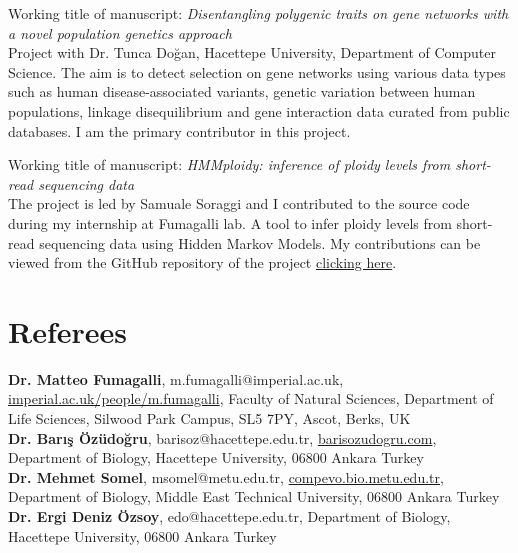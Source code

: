 \documentclass[letterpaper,11pt]{article}
\begin{document}
Working title of manuscript: \textit{Disentangling polygenic traits on gene networks with a novel population genetics approach} \\
Project with Dr. Tunca Do\u{g}an, Hacettepe University, Department of Computer Science. The aim is to detect selection on gene networks using various data types such as human disease-associated variants, genetic variation between human populations, linkage disequilibrium and gene interaction data curated from public databases. I am the primary contributor in this project.
\medskip

Working title of manuscript: \textit{HMMploidy: inference of ploidy levels from short-read sequencing data}\\
The project is led by Samuale Soraggi and I contributed to the source code during my internship at Fumagalli lab. A tool to infer ploidy levels from short-read sequencing data using Hidden Markov Models. My contributions can be viewed from the GitHub repository of the project \href {https://github.com/isinaltinkaya/HMMploidy}{clicking here}.



\section{Referees}
\textbf{Dr. Matteo Fumagalli}, m.fumagalli@imperial.ac.uk, \href{https://www.imperial.ac.uk/people/m.fumagalli}{imperial.ac.uk/people/m.fumagalli}, Faculty of Natural Sciences, Department of Life Sciences, Silwood Park Campus, SL5 7PY, Ascot, Berks, UK \\
\textbf{Dr. Bar{\i}\c{s} \"{O}z\"{u}do\u{g}ru}, barisoz@hacettepe.edu.tr, \href{https://www.barisozudogru.com/}{barisozudogru.com}, Department of Biology, Hacettepe University, 06800 Ankara Turkey \\
\textbf{Dr. Mehmet Somel}, msomel@metu.edu.tr, \href{http://compevo.bio.metu.edu.tr}{compevo.bio.metu.edu.tr}, Department of Biology, Middle East Technical University, 06800 Ankara Turkey \\
\textbf{Dr. Ergi Deniz \"{O}zsoy}, edo@hacettepe.edu.tr, Department of Biology, Hacettepe University, 06800 Ankara Turkey  \\

\end{document}

